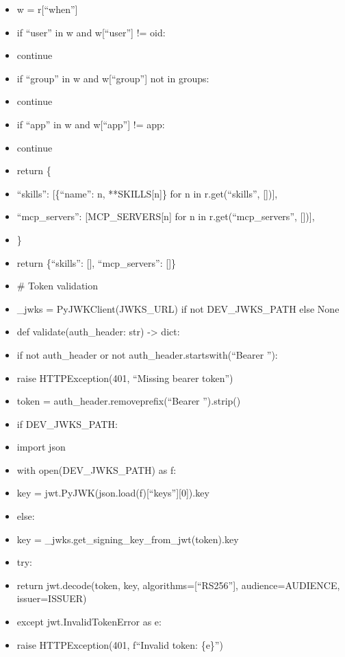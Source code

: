 \documentclass[11pt]{article}
\begin{document}
\begin{itemize}[leftmargin=*,itemsep=2pt,topsep=2pt]
\item {} w = r[``when'']
\item {} if ``user'' in w and w[``user''] != oid:
\item {} continue
\item {} if ``group'' in w and w[``group''] not in groups:
\item {} continue
\item {} if ``app'' in w and w[``app''] != app:
\item {} continue
\item {} return \{
\item {} ``skills'': [\{``name'': n, **SKILLS[n]\} for n in r.get(``skills'', [])],
\item {} ``mcp\_\allowbreak{}servers'': [MCP\_\allowbreak{}SERVERS[n] for n in r.get(``mcp\_\allowbreak{}servers'', [])],
\item {} \}
\item {} return \{``skills'': [], ``mcp\_\allowbreak{}servers'': []\}
\item {} \# Token validation
\item {} \_\allowbreak{}jwks = PyJWKClient(JWKS\_\allowbreak{}URL) if not DEV\_\allowbreak{}JWKS\_\allowbreak{}PATH else None
\item {} def validate(auth\_\allowbreak{}header: str) -> dict:
\item {} if not auth\_\allowbreak{}header or not auth\_\allowbreak{}header.startswith(``Bearer ''):
\item {} raise HTTPException(401, ``Missing bearer token'')
\item {} token = auth\_\allowbreak{}header.removeprefix(``Bearer '').strip()
\item {} if DEV\_\allowbreak{}JWKS\_\allowbreak{}PATH:
\item {} import json
\item {} with open(DEV\_\allowbreak{}JWKS\_\allowbreak{}PATH) as f:
\item {} key = jwt.PyJWK(json.load(f)[``keys''][0]).key
\item {} else:
\item {} key = \_\allowbreak{}jwks.get\_\allowbreak{}signing\_\allowbreak{}key\_\allowbreak{}from\_\allowbreak{}jwt(token).key
\item {} try:
\item {} return jwt.decode(token, key, algorithms=[``RS256''], audience=AUDIENCE, issuer=ISSUER)
\item {} except jwt.InvalidTokenError as e:
\item {} raise HTTPException(401, f``Invalid token: \{e\}'')

\end{itemize}
\end{document}
